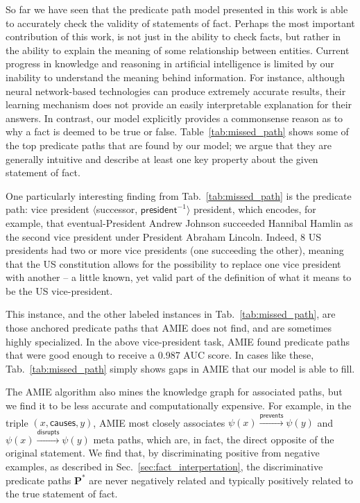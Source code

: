 \documentclass[reprint,twocolumn,showpacs,preprintnumbers,amsmath, aps,pre,amssymb]{revtex4-1}
\begin{document}
So far we have seen that the predicate path model presented in this work is able to accurately check the validity of statements of fact. Perhaps the most important contribution of this work, is not just in the ability to check facts, but rather in the ability to explain the meaning of some relationship between entities. Current progress in knowledge and reasoning in artificial intelligence is limited by our inability to understand the meaning behind information. For instance, although neural network-based technologies can produce extremely accurate results, their learning mechanism does not provide an easily interpretable explanation for their answers. In contrast, our model explicitly provides a commonsense reason as to why a fact is deemed to be true or false. Table~\ref{tab:missed_path} shows some of the top predicate paths that are found by our model; we argue that they are generally intuitive and describe at least one key property about the given statement of fact.

One particularly interesting finding from Tab.~\ref{tab:missed_path} is the predicate path: \textsf{vice president} $\langle$\textsf{successor}, $\textsf{president}^{-1}\rangle$ \textsf{president}, which encodes, for example, that eventual-President Andrew Johnson succeeded Hannibal Hamlin as the second vice president under President Abraham Lincoln. Indeed, 8 US presidents had two or more vice presidents (one succeeding the other), meaning that the US constitution allows for the possibility to replace one vice president with another -- a little known, yet valid part of the definition of what it means to be the US vice-president.

This instance, and the other labeled instances in Tab.~\ref{tab:missed_path}, are those anchored predicate paths that AMIE does not find, and are sometimes highly specialized. In the above vice-president task, AMIE found predicate paths that were good enough to receive a 0.987 AUC score. In cases like these, Tab.~\ref{tab:missed_path} simply shows gaps in AMIE that our model is able to fill.

The AMIE algorithm also mines the knowledge graph for associated paths, but we find it to be less accurate and computationally expensive. For example, in the triple $(x, \textsf{causes}, y)$, AMIE most closely associates $\psi(x)\xrightarrow{\textsf{prevents}}\psi(y)$ and $\psi(x)\xrightarrow{\textsf{disrupts}}\psi(y)$ meta paths, which are, in fact, the direct opposite of the original statement. We find that, by discriminating positive from negative examples, as described in Sec.~\ref{sec:fact_interpertation}, the discriminative predicate paths $\mathbf{P}^*$ are never negatively related and typically positively related to the true statement of fact.
\end{document}
